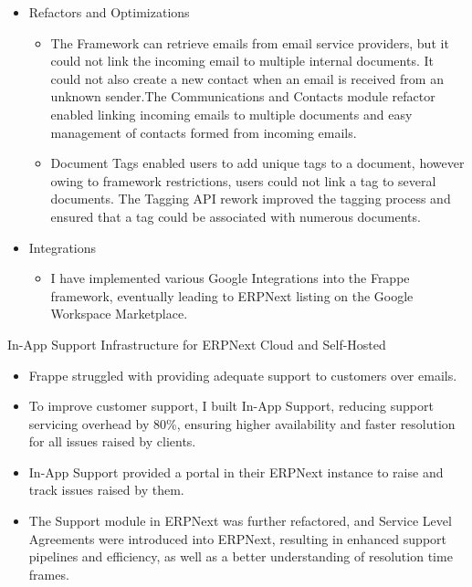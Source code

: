\begin{cventries}
{\begin{cvitems}
\begin{itemize}
\begin{itemize}
                    \end{itemize}
                \item {Refactors and Optimizations}
                    \begin{itemize}
                        \item {The Framework can retrieve emails from email service providers, but it could not link the incoming email to multiple internal documents. It could not also create a new contact when an email is received from an unknown sender.The Communications and Contacts module refactor enabled linking incoming emails to multiple documents and easy management of contacts formed from incoming emails.}
                        \item {Document Tags enabled users to add unique tags to a document, however owing to framework restrictions, users could not link a tag to several documents. The Tagging API rework improved the tagging process and ensured that a tag could be associated with numerous documents.}
                    \end{itemize}    
                \item {Integrations}
                    \begin{itemize}
                        \item {I have implemented various Google Integrations into the Frappe framework, eventually leading to ERPNext listing on the Google Workspace Marketplace.}
                    \end{itemize}
            \end{itemize}
        \item {In-App Support Infrastructure for ERPNext Cloud and Self-Hosted}
            \begin{itemize}
                \item {Frappe struggled with providing adequate support to customers over emails.}
                \item {To improve customer support, I built In-App Support, reducing support servicing overhead by 80\%, ensuring higher availability and faster resolution for all issues raised by clients.}
                \item {In-App Support provided a portal in their ERPNext instance to raise and track issues raised by them.}
                \item {The Support module in ERPNext was further refactored, and Service Level Agreements were introduced into ERPNext, resulting in enhanced support pipelines and efficiency, as well as a better understanding of resolution time frames.}
            \end{itemize}
      \end{cvitems}
    }
\end{cventries}